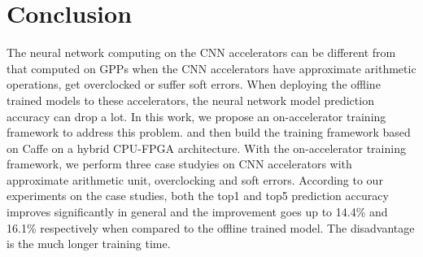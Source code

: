 \section{Conclusion} \label{sec:Conclusion}
The neural network computing on the CNN accelerators 
can be different from that computed on GPPs when the 
CNN accelerators have approximate arithmetic operations, 
get overclocked or suffer soft errors. When deploying the offline
trained models to these accelerators, the neural network model 
prediction accuracy can drop a lot. In this work, we propose an 
on-accelerator training framework to address this problem.
and then build the training framework based on Caffe on a 
hybrid CPU-FPGA architecture. With the on-accelerator training 
framework, we perform three 
case studyies on CNN accelerators with approximate arithmetic unit, 
overclocking and soft errors. According to our 
experiments on the case studies, both the top1 and top5 prediction 
accuracy improves significantly in general and the improvement goes 
up to 14.4\% and 16.1\% respectively when compared to the 
offline trained model. The disadvantage is the 
much longer training time.



